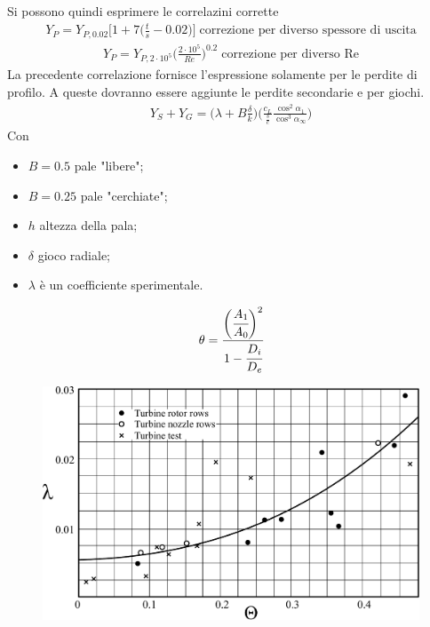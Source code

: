 Si possono quindi esprimere le correlazini corrette
\begin{align*}
Y_P = Y_{P,0.02} \bigg[ 1 + 7 \bigg( \frac{t}{s} - 0.02 \bigg) \bigg] \; \mbox{correzione per diverso spessore di uscita}
\end{align*}
\begin{align*}
Y_P = Y_{P,2 \cdot 10^5} \bigg( \frac{2 \cdot 10^5}{Re} \bigg)^{0.2} \; \mbox{correzione per diverso Re}
\end{align*}
La precedente correlazione fornisce l'espressione solamente per le perdite di profilo. A queste dovranno essere aggiunte le perdite secondarie e per giochi.
\begin{align*}
Y_S + Y_G = \Big( \lambda + B \frac{\delta}{k} \Big) \Bigg( \frac{c_L}{\frac{s}{c}} \frac{\cos^2 \alpha_1}{\cos^3 \alpha_{\infty}} \Bigg)
\end{align*}
Con
\begin{itemize}
\item $B = 0.5$ pale "libere";
\item $B = 0.25$ pale "cerchiate";
\item $h$ altezza della pala;
\item $\delta$ gioco radiale;
\item $\lambda$ è un coefficiente sperimentale.
\end{itemize}
\begin{align*}
\theta = \cfrac{\bigg(\cfrac{A_1}{A_0}\bigg)^2}{1- \cfrac{D_i}{D_e}}
\end{align*}
\begin{figure}
\centering
  \includegraphics[width=.6\textwidth]{fig/lambdaPerditeSchiera.pdf}
\caption{}
\label{fig:lambdaPerditeSchiera}
\end{figure}

